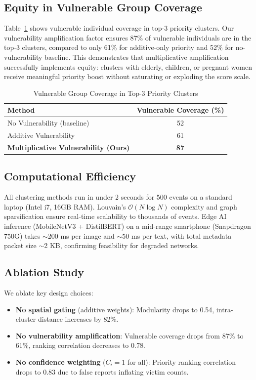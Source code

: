\documentclass[runningheads]{llncs}
\begin{document}
\subsection{Equity in Vulnerable Group Coverage}

Table~\ref{tab:equity} shows vulnerable individual coverage in top-3 priority clusters. Our vulnerability amplification factor ensures 87\% of vulnerable individuals are in the top-3 clusters, compared to only 61\% for additive-only priority and 52\% for no-vulnerability baseline. This demonstrates that multiplicative amplification successfully implements equity: clusters with elderly, children, or pregnant women receive meaningful priority boost without saturating or exploding the score scale.

\begin{table}[t]
\caption{Vulnerable Group Coverage in Top-3 Priority Clusters}\label{tab:equity}
\centering
\begin{tabular}{lc}
\toprule
Method & Vulnerable Coverage (\%) \\
\midrule
No Vulnerability (baseline) & 52 \\
Additive Vulnerability & 61 \\
\textbf{Multiplicative Vulnerability (Ours)} & \textbf{87} \\
\bottomrule
\end{tabular}
\end{table}

\subsection{Computational Efficiency}

All clustering methods run in under 2 seconds for 500 events on a standard laptop (Intel i7, 16GB RAM). Louvain's $\mathcal{O}(N \log N)$ complexity and graph sparsification ensure real-time scalability to thousands of events. Edge AI inference (MobileNetV3 + DistilBERT) on a mid-range smartphone (Snapdragon 750G) takes $\sim$200 ms per image and $\sim$50 ms per text, with total metadata packet size $\sim$2 KB, confirming feasibility for degraded networks.

\subsection{Ablation Study}

We ablate key design choices:
\begin{itemize}
\item \textbf{No spatial gating} (additive weights): Modularity drops to 0.54, intra-cluster distance increases by 82\%.
\item \textbf{No vulnerability amplification}: Vulnerable coverage drops from 87\% to 61\%, ranking correlation decreases to 0.78.
\item \textbf{No confidence weighting} ($C_i=1$ for all): Priority ranking correlation drops to 0.83 due to false reports inflating victim counts.
\end{itemize}
\end{document}
